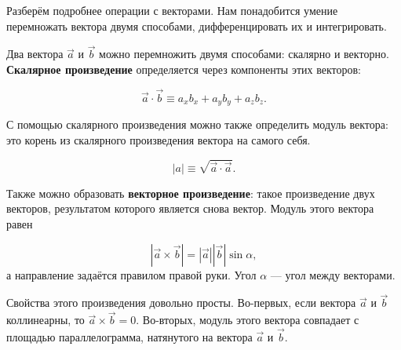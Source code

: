 \documentclass[a4paper,12pt]{article}
\numberwithin{equation}{section}
\begin{document}
Разберём подробнее операции с векторами. Нам понадобится умение
перемножать вектора двумя способами, дифференцировать их и
интегрировать. 

Два вектора $\vec{a}$ и $\vec{b}$ можно перемножить двумя способами:
скалярно и векторно. \textbf{Скалярное произведение} определяется через
компоненты этих векторов:

\begin{equation}
  \label{eq:def_scalar_product}
  \vec{a} \cdot \vec{b} \equiv a_x b_x + a_y b_y + a_z b_z.
\end{equation}

С помощью скалярного произведения можно также определить модуль
вектора: это корень из скалярного произведения вектора на самого себя.

\begin{equation}
  \label{eq:def_modulus_vector}
  |a| \equiv \sqrt{\vec{a} \cdot \vec{a}}.
\end{equation}

Также можно образовать \textbf{векторное произведение}: такое
произведение двух векторов, результатом которого является снова
вектор. Модуль этого вектора равен

\begin{equation}
  \label{eq:def_cross_product}
  | \vec{a} \times \vec{b}| = |\vec{a}| |\vec{b}| \sin \alpha,  
\end{equation}
а направление задаётся правилом правой руки. Угол $\alpha$ --- угол
между векторами. 

\begin{figure}
  \vspace{-0.7cm}
  \begin{center}
  \end{center}
  \label{fig:curl}
  \vspace{-1cm}
\end{figure}

Свойства этого произведения довольно просты. Во-первых, если вектора
$\vec{a}$ и $\vec{b}$ коллинеарны, то $\vec{a} \times
\vec{b}=0$. Во-вторых, модуль этого вектора совпадает с площадью
параллелограмма, натянутого на вектора $\vec{a}$ и $\vec{b}$.
\end{document}
